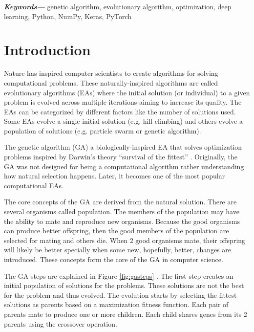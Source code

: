 \documentclass[conference]{IEEEtran}
\providecommand{\keywords}[1]
{
  \small	
  \textbf{\textit{Keywords---}} #1
}
\begin{document}
\keywords{genetic algorithm, evolutionary algorithm, optimization, deep learning, Python, NumPy, Keras, PyTorch}



%
\IEEEpeerreviewmaketitle



\section{Introduction}
Nature has inspired computer scientists to create algorithms for solving computational problems. These naturally-inspired algorithms are called evolutionary algorithms (EAs) \cite{SimonEA} where the initial solution (or individual) to a given problem is evolved across multiple iterations aiming to increase its quality. The EAs can be categorized by different factors like the number of solutions used. Some EAs evolve a single initial solution (e.g. hill-climbing) and others evolve a population of solutions (e.g. particle swarm or genetic algorithm).

The genetic algorithm (GA) a biologically-inspired EA that solves optimization problems inspired by Darwin's theory ``survival of the fittest'' \cite{SimonEA, GadGA}. Originally, the GA was not designed for being a computational algorithm rather understanding how natural selection happens. Later, it becomes one of the most popular computational EAs.

The core concepts of the GA are derived from the natural solution. There are several organisms called population. The members of the population may have the ability to mate and reproduce new organisms. Because the good organisms can produce better offspring, then the good members of the population are selected for mating and others die. When 2 good organisms mate, their offspring will likely be better specially when some new, hopefully, better, changes are introduced. These concepts form the core of the GA in computer science.

The GA steps are explained in Figure \ref{fig:gasteps} \cite{GadGA}. The first step creates an initial population of solutions for the problems. These solutions are not the best for the problem and thus evolved. The evolution starts by selecting the fittest solutions as parents based on a maximization fitness function. Each pair of parents mate to produce one or more children. Each child shares genes from its 2 parents using the crossover operation. 
\end{document}

